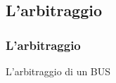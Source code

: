 %	
%		
%	





\subsection[L'arbitraggio]{L'arbitraggio}
\begin{frame}
	\frametitle{L'arbitraggio}
	  
	\begin{block}{L'arbitraggio di un BUS}
		
		
	\end{block}

\end{frame}



